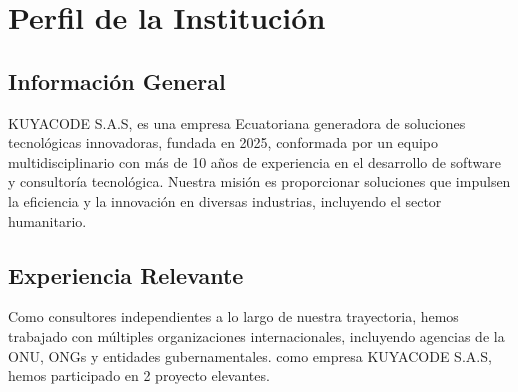 \section{Perfil de la Institución}
\label{sec:perfil_institucion}
\subsection{Información General}

KUYACODE S.A.S, es una empresa Ecuatoriana generadora de soluciones tecnológicas innovadoras, fundada en 2025, conformada por un equipo multidisciplinario con más de 10 años de experiencia en el desarrollo de software y consultoría tecnológica. Nuestra misión es proporcionar soluciones que impulsen la eficiencia y la innovación en diversas industrias, incluyendo el sector humanitario.

\subsection{Experiencia Relevante}

Como consultores independientes a lo largo de nuestra trayectoria, hemos trabajado con múltiples organizaciones internacionales, incluyendo agencias de la ONU, ONGs y entidades gubernamentales. como empresa KUYACODE S.A.S, hemos participado en 2 proyecto elevantes.

